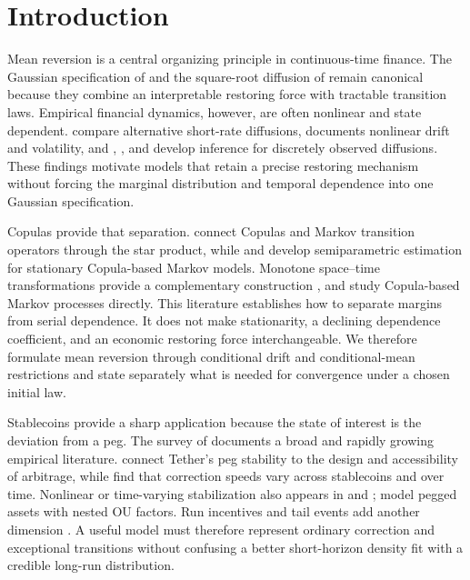 \section{Introduction}
\label{sec:introduction}

Mean reversion is a central organizing principle in continuous-time finance.
The Gaussian specification of \citet{Vasicek1977} and the square-root
diffusion of \citet{CoxIngersollRoss1985} remain canonical because they
combine an interpretable restoring force with tractable transition laws.
Empirical financial dynamics, however, are often nonlinear and state
dependent.  \citet{ChanEtAl1992} compare alternative short-rate diffusions,
\citet{AitSahalia1996} documents nonlinear drift and volatility, and
\citet{BibbySorensen1995}, \citet{Kessler1997}, and
\citet{AitSahalia2002} develop inference for discretely observed diffusions.
These findings motivate models that retain a precise restoring mechanism
without forcing the marginal distribution and temporal dependence into one
Gaussian specification.

Copulas provide that separation.  \citet{DarsowNguyenOlsen1992} connect
Copulas and Markov transition operators through the star product, while
\citet{ChenFan2006} and \citet{ChenWuYi2009} develop semiparametric
estimation for stationary Copula-based Markov models.  Monotone
space--time transformations provide a complementary construction
\citep{BibbonaSacerdoteTorre2016}, and \citet{FangJiangLiuYang2020} study
Copula-based Markov processes directly.  This literature establishes how to
separate margins from serial dependence.  It does not make stationarity, a
declining dependence coefficient, and an economic restoring force
interchangeable.  We therefore formulate mean reversion through conditional
drift and conditional-mean restrictions and state separately what is needed
for convergence under a chosen initial law.

Stablecoins provide a sharp application because the state of interest is the
deviation from a peg.  The survey of \citet{AnteEtAl2023} documents a broad
and rapidly growing empirical literature.  \citet{LyonsViswanathNatraj2023}
connect Tether's peg stability to the design and accessibility of arbitrage,
while \citet{DuanUrquhart2023} find that correction speeds vary across
stablecoins and over time.  Nonlinear or time-varying stabilization also
appears in \citet{DjogbenouInanJasiak2023} and
\citet{HuiWongLo2025}; \citet{BergaultEtAl2024} model pegged assets with
nested OU factors.  Run incentives and tail events add another dimension
\citep{MaZengZhang2023,LiuMakarovSchoar2023,AhmedAldasoroDuley2025,
EichengreenNguyenViswanathNatraj2025}.  A useful model must therefore
represent ordinary correction and exceptional transitions without confusing
a better short-horizon density fit with a credible long-run distribution.

